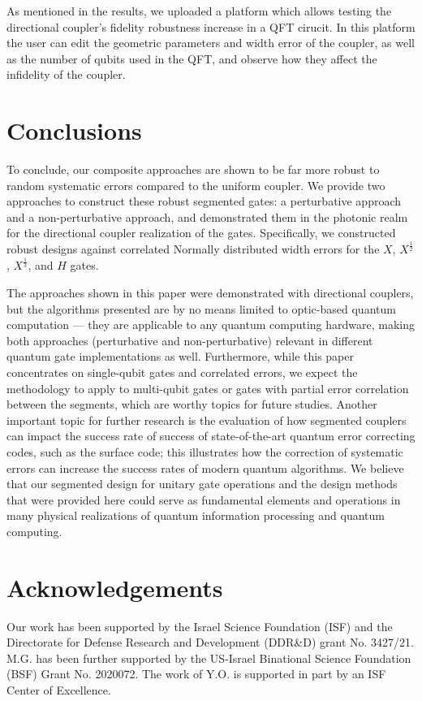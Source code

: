\documentclass[floatfix,reprint, amsmath,amssymb,aps,superscriptaddress,nofootinbib]{revtex4-2}
\begin{document}
As mentioned in the results, we uploaded a platform which allows testing the directional coupler's fidelity robustness increase in a QFT cirucit. In this platform the user can edit the geometric parameters and width error of the coupler, as well as the number of qubits used in the QFT, and observe how they affect the infidelity of the coupler. 


\section{Conclusions \label{sec: Conclusions}}

To conclude, our composite approaches are shown to be far more robust to random systematic errors compared to the uniform coupler. We provide two approaches to construct these robust segmented gates: a perturbative approach and a non-perturbative approach, and demonstrated them in the photonic realm for the directional coupler realization of the gates. Specifically, we constructed robust designs against correlated Normally distributed width errors for the $X$, ${X}^{\frac{1}{2}}$, ${X}^{\frac{1}{3}}$, and $H$ gates.


The approaches shown in this paper were demonstrated with directional couplers, but the algorithms presented are by no means limited to optic-based quantum computation --- they are applicable to any quantum computing hardware, making both approaches (perturbative and non-perturbative) relevant in different quantum gate implementations as well.
Furthermore, while this paper concentrates on single-qubit gates and correlated errors, we expect the methodology to apply to multi-qubit gates or gates with partial error correlation between the segments, which are worthy topics for future studies.
Another important topic for further research is the evaluation of how segmented couplers can impact the success rate of success of state-of-the-art quantum error correcting codes, such as the surface code; this illustrates how the correction of systematic errors can increase the success rates of modern quantum algorithms. We believe that our segmented design for unitary gate operations and the design methods that were provided here could serve as fundamental elements and operations in many physical realizations of quantum information processing and quantum computing.


\section*{Acknowledgements}
Our work has been supported by the Israel Science
Foundation (ISF) and the Directorate for Defense Research and Development (DDR\&D) grant No. 3427/21.
M.G. has been further supported by the US-Israel Binational Science Foundation (BSF) Grant No. 2020072.
The work of Y.O. is supported in part by an ISF Center of Excellence.
\end{document}
